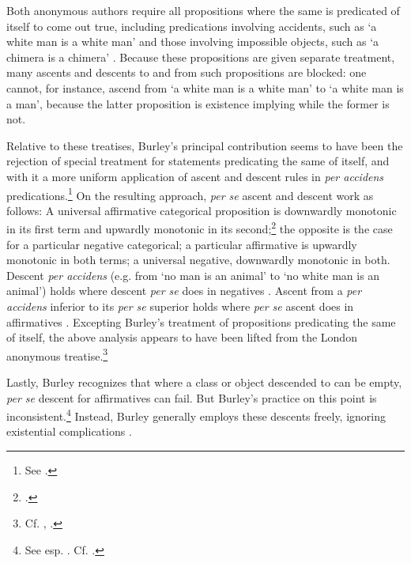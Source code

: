\documentclass[]{birkjour}
\begin{document}
Both anonymous authors require all propositions where the same is predicated of itself to come out true, including predications involving accidents, such as `a white man is a white man' and those involving impossible objects, such as `a chimera is a chimera' \autocite[p. 8, par. 23; p. 11, par. 36-37; p. 18, par. 31-32]{Green-Pedersen1980a}. Because these propositions are given separate treatment, many ascents and descents to and from such propositions are blocked: one cannot, for instance, ascend from `a white man is a white man' to `a white man is a man', because the latter proposition is existence implying while the former is not. 

Relative to these treatises, Burley's principal contribution seems to have been the rejection of special treatment for statements predicating the same of itself, and with it a more uniform application of ascent and descent rules in \textit{per accidens} predications.\footnote{See \autocite[pp. 116-117, par. 19-20; 134, par. 95; p. 158, par. 160.]{Green-Pedersen1980b}.} On the resulting approach, \textit{per se} ascent and descent work as follows: A universal affirmative categorical proposition is downwardly monotonic in its first term and upwardly monotonic in its second;\footnote{\autocite[p. 211.16-20]{BurleyDPAL}.} the opposite is the case for a particular negative categorical; a particular affirmative is upwardly monotonic in both terms; a universal negative, downwardly monotonic in both. Descent \textit{per accidens} (e.g. from `no man is an animal' to `no white man is an animal') holds where descent \textit{per se} does in negatives \autocite[pp. 209.35-210.10]{BurleyDPAL}. Ascent from a \textit{per accidens} inferior to its \textit{per se} superior holds where \textit{per se} ascent does in affirmatives \autocite[pp. 116-117, par. 20]{Green-Pedersen1980b}. Excepting Burley's treatment of propositions predicating the same of itself, the above analysis appears to have been lifted from the London anonymous treatise.\footnote{Cf. \autocite[pp. 10-11, par. 35-37]{Green-Pedersen1980a}, \autocite[pp. 116-117, par. 19-20]{Green-Pedersen1980b}.} 

Lastly, Burley recognizes that where a class or object descended to can be empty, \textit{per se} descent for affirmatives can fail. But Burley's practice on this point is inconsistent.\footnote{See esp. \autocite[pp. 61.4, 85.16; 85.4, 211.27-28]{BurleyDPAL}. Cf. \autocite{Mora-Marquez2015}.} Instead, Burley generally employs these descents freely, ignoring existential complications \autocite[pp. 23.26, 26.26, 31.21, 67.19, 67.30, 85.16, 85.26, 211.27-28]{BurleyDPAL}.
\end{document}
